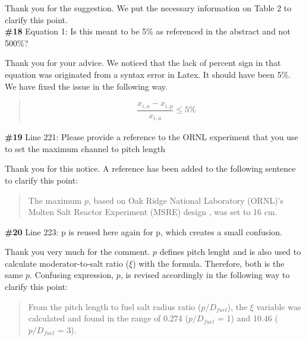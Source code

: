 \documentclass{ar2rc}
\begin{document}
    \Response Thank you for the suggestion. We put the necessary information on Table 2 to clarify this point.\\


    \Comment \textbf{\#18} Equation 1: Is this meant to be 5\% as referenced in the abstract
    and not 500\%?

    \Response Thank you for your advice. We noticed that the lack of percent
    sign in that equation was originated from a syntax error in Latex. It
    should have been 5\%. We have fixed the issue in the following way.

    \begin{quote}
        \begin{eqnarray}
            \dfrac{x_{i,a}-x_{i,p}}{x_{i,a}} \leq 5\%
        \end{eqnarray}
    \end{quote}


    \Comment \textbf{\#19} Line 221: Please provide a reference to the ORNL experiment that
    you use to set the maximum channel to pitch length

    \Response Thank you for this notice. A reference has been added to the following sentence to
    clarify this point:\\

    \begin{quote}
        The maximum $p$, based on Oak Ridge National Laboratory (ORNL)'s Molten
        Salt Reactor Experiment (MSRE) design \cite{robertson1971}, was set to 16 cm.
    \end{quote}


    \Comment \textbf{\#20} Line 223: p is reused here again for p, which creates a small
    confusion.

    \Response Thank you very much for the comment. $p$ defines pitch lenght and is also used to calculate moderator-to-salt ratio ($\xi$) with the formula. Therefore, both is the same $p$. Confusing expression, $p$, is revised accordingly in the following way to clarify this point:\\

    \begin{quote}
        From the pitch length to fuel salt radius ratio ($p/D_{fuel}$), the
        $\xi$ variable was calculated and found in the range of 0.274
        ($p/D_{fuel}$ = 1) and 10.46 ($p/D_{fuel}$ = 3).
    \end{quote}
\end{document}
